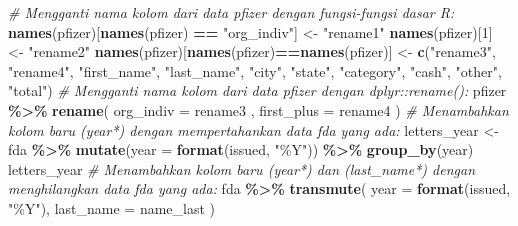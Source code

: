 \documentclass[
]{book}
\newenvironment{Shaded}{\begin{snugshade}}{\end{snugshade}}
\newcommand{\AttributeTok}[1]{\textcolor[rgb]{0.13,0.29,0.53}{#1}}
\newcommand{\CommentTok}[1]{\textcolor[rgb]{0.56,0.35,0.01}{\textit{#1}}}
\newcommand{\DecValTok}[1]{\textcolor[rgb]{0.00,0.00,0.81}{#1}}
\newcommand{\FunctionTok}[1]{\textcolor[rgb]{0.13,0.29,0.53}{\textbf{#1}}}
\newcommand{\NormalTok}[1]{#1}
\newcommand{\OtherTok}[1]{\textcolor[rgb]{0.56,0.35,0.01}{#1}}
\newcommand{\SpecialCharTok}[1]{\textcolor[rgb]{0.81,0.36,0.00}{\textbf{#1}}}
\newcommand{\StringTok}[1]{\textcolor[rgb]{0.31,0.60,0.02}{#1}}
\begin{document}
\begin{Shaded}
\begin{Highlighting}[]
\CommentTok{\# Mengganti nama kolom dari data \textasciigrave{}pfizer\textasciigrave{} dengan fungsi{-}fungsi dasar R:}
\FunctionTok{names}\NormalTok{(pfizer)[}\FunctionTok{names}\NormalTok{(pfizer) }\SpecialCharTok{==} \StringTok{"org\_indiv"}\NormalTok{] }\OtherTok{\textless{}{-}} \StringTok{"rename1"}
\FunctionTok{names}\NormalTok{(pfizer)[}\DecValTok{1}\NormalTok{] }\OtherTok{\textless{}{-}} \StringTok{"rename2"}
\FunctionTok{names}\NormalTok{(pfizer)[}\FunctionTok{names}\NormalTok{(pfizer)}\SpecialCharTok{==}\FunctionTok{names}\NormalTok{(pfizer)] }\OtherTok{\textless{}{-}} \FunctionTok{c}\NormalTok{(}\StringTok{"rename3"}\NormalTok{,}
                                                 \StringTok{"rename4"}\NormalTok{,}
                                                 \StringTok{"first\_name"}\NormalTok{,}
                                                 \StringTok{"last\_name"}\NormalTok{,}
                                                 \StringTok{"city"}\NormalTok{,}
                                                 \StringTok{"state"}\NormalTok{,}
                                                 \StringTok{"category"}\NormalTok{,}
                                                 \StringTok{"cash"}\NormalTok{,}
                                                 \StringTok{"other"}\NormalTok{,}
                                                 \StringTok{"total"}\NormalTok{)}
\CommentTok{\# Mengganti nama kolom dari data \textasciigrave{}pfizer\textasciigrave{} dengan \textasciigrave{}dplyr::rename()\textasciigrave{}:}
\NormalTok{pfizer }\SpecialCharTok{\%\textgreater{}\%} 
  \FunctionTok{rename}\NormalTok{(}
    \AttributeTok{org\_indiv =}\NormalTok{ rename3 ,}
    \AttributeTok{first\_plus =}\NormalTok{ rename4  }
\NormalTok{    )}
\CommentTok{\# Menambahkan kolom baru (year*) dengan mempertahankan data \textasciigrave{}fda\textasciigrave{} yang ada:}
\NormalTok{letters\_year }\OtherTok{\textless{}{-}}\NormalTok{ fda }\SpecialCharTok{\%\textgreater{}\%}
  \FunctionTok{mutate}\NormalTok{(}\AttributeTok{year =} \FunctionTok{format}\NormalTok{(issued, }\StringTok{"\%Y"}\NormalTok{)) }\SpecialCharTok{\%\textgreater{}\%}
  \FunctionTok{group\_by}\NormalTok{(year)}
\NormalTok{letters\_year}
\CommentTok{\# Menambahkan kolom baru (year*) dan (last\_name*) dengan menghilangkan data \textasciigrave{}fda\textasciigrave{} yang ada:}
\NormalTok{fda }\SpecialCharTok{\%\textgreater{}\%}
  \FunctionTok{transmute}\NormalTok{(}
    \AttributeTok{year =} \FunctionTok{format}\NormalTok{(issued, }\StringTok{"\%Y"}\NormalTok{),}
    \AttributeTok{last\_name =}\NormalTok{ name\_last  }
\NormalTok{    )}
\end{Highlighting}
\end{Shaded}
\end{document}
